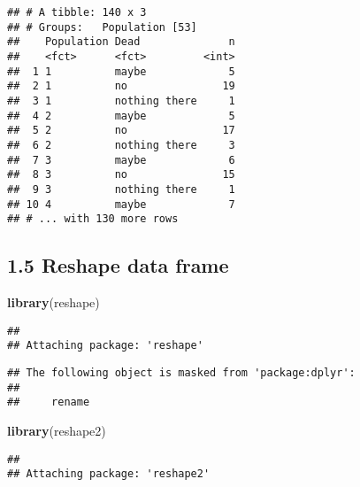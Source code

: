 \documentclass[]{article}
\newenvironment{Shaded}{\begin{snugshade}}{\end{snugshade}}
\newcommand{\KeywordTok}[1]{\textcolor[rgb]{0.13,0.29,0.53}{\textbf{#1}}}
\newcommand{\StringTok}[1]{\textcolor[rgb]{0.31,0.60,0.02}{#1}}
\newcommand{\OperatorTok}[1]{\textcolor[rgb]{0.81,0.36,0.00}{\textbf{#1}}}
\newcommand{\NormalTok}[1]{#1}
\begin{document}
\begin{Shaded}
\end{Shaded}

\begin{verbatim}
## # A tibble: 140 x 3
## # Groups:   Population [53]
##    Population Dead              n
##    <fct>      <fct>         <int>
##  1 1          maybe             5
##  2 1          no               19
##  3 1          nothing there     1
##  4 2          maybe             5
##  5 2          no               17
##  6 2          nothing there     3
##  7 3          maybe             6
##  8 3          no               15
##  9 3          nothing there     1
## 10 4          maybe             7
## # ... with 130 more rows
\end{verbatim}

\subsection{1.5 Reshape data frame}\label{reshape-data-frame}

\begin{Shaded}
\begin{Highlighting}[]
\KeywordTok{library}\NormalTok{(reshape)}
\end{Highlighting}
\end{Shaded}

\begin{verbatim}
## 
## Attaching package: 'reshape'
\end{verbatim}

\begin{verbatim}
## The following object is masked from 'package:dplyr':
## 
##     rename
\end{verbatim}

\begin{Shaded}
\begin{Highlighting}[]
\KeywordTok{library}\NormalTok{(reshape2)}
\end{Highlighting}
\end{Shaded}

\begin{verbatim}
## 
## Attaching package: 'reshape2'
\end{verbatim}
\end{document}
